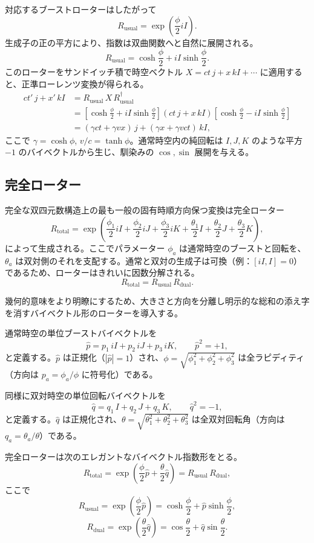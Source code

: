 \documentclass[a4paper]{article}
\begin{document}
対応するブーストローターはしたがって
\[
R_\text{usual} = \exp\!\left( \frac{\phi}{2} iI \right).
\]
生成子の正の平方により、指数は双曲関数へと自然に展開される。
\[
R_\text{usual} = \cosh \frac{\phi}{2} + iI \sinh \frac{\phi}{2}.
\]
このローターをサンドイッチ積で時空ベクトル $X = ct \, j + x \, kI + \cdots$ に適用すると、正準ローレンツ変換が得られる。
\begin{align*}
ct' \, j + x' \, kI &= R_\text{usual} \, X \, R_\text{usual}^\dagger \\
&= \left[ \cosh\frac{\phi}{2} + iI \sinh\frac{\phi}{2} \right] (ct \, j + x \, kI) \left[ \cosh\frac{\phi}{2} - iI \sinh\frac{\phi}{2} \right] \\
&= (\gamma ct + \gamma v x) \, j + (\gamma x + \gamma v ct) \, kI,
\end{align*}
ここで $\gamma = \cosh \phi$, $v/c = \tanh \phi$。通常時空内の純回転は $I,J,K$ のような平方 $-1$ のバイベクトルから生じ、馴染みの $\cos,\sin$ 展開を与える。

\subsection{完全ローター}

完全な双四元数構造上の最も一般の固有時順方向保つ変換は完全ローター
\[
R_\text{total} = \exp\left( \frac{\phi_1}{2} iI + \frac{\phi_2}{2} iJ + \frac{\phi_3}{2} iK + \frac{\theta_1}{2} I + \frac{\theta_2}{2} J + \frac{\theta_3}{2} K \right),
\]
によって生成される。ここでパラメーター $\phi_a$ は通常時空のブーストと回転を、$\theta_a$ は双対側のそれを支配する。通常と双対の生成子は可換（例：$[iI, I] = 0$）であるため、ローターはきれいに因数分解される。
\[
R_\text{total} = R_\text{usual} \, R_\text{dual}.
\]

幾何的意味をより明瞭にするため、大きさと方向を分離し明示的な総和の添え字を消すバイベクトル形のローターを導入する。

通常時空の単位ブーストバイベクトルを
\[
\hat{p} = p_1 \, iI + p_2 \, iJ + p_3 \, iK, \qquad \hat{p}^2 = +1,
\]
と定義する。$\hat{p}$ は正規化（$|\hat{p}| = 1$）され、$\phi = \sqrt{\phi_1^2 + \phi_2^2 + \phi_3^2}$ は全ラピディティ（方向は $p_a = \phi_a / \phi$ に符号化）である。

同様に双対時空の単位回転バイベクトルを
\[
\hat{q} = q_1 \, I + q_2 \, J + q_3 \, K, \qquad \hat{q}^2 = -1,
\]
と定義する。$\hat{q}$ は正規化され、$\theta = \sqrt{\theta_1^2 + \theta_2^2 + \theta_3^2}$ は全双対回転角（方向は $q_a = \theta_a / \theta$）である。

完全ローターは次のエレガントなバイベクトル指数形をとる。
\[
R_\text{total} = \exp\!\left( \frac{\phi}{2} \hat{p} + \frac{\theta}{2} \hat{q} \right)
= R_\text{usual} \, R_\text{dual},
\]
ここで
\[
R_\text{usual} = \exp\!\left( \frac{\phi}{2} \hat{p} \right)
= \cosh\frac{\phi}{2} + \hat{p} \sinh\frac{\phi}{2},
\]
\[
R_\text{dual} = \exp\!\left( \frac{\theta}{2} \hat{q} \right)
= \cos\frac{\theta}{2} + \hat{q} \sin\frac{\theta}{2}.
\]
\end{document}
